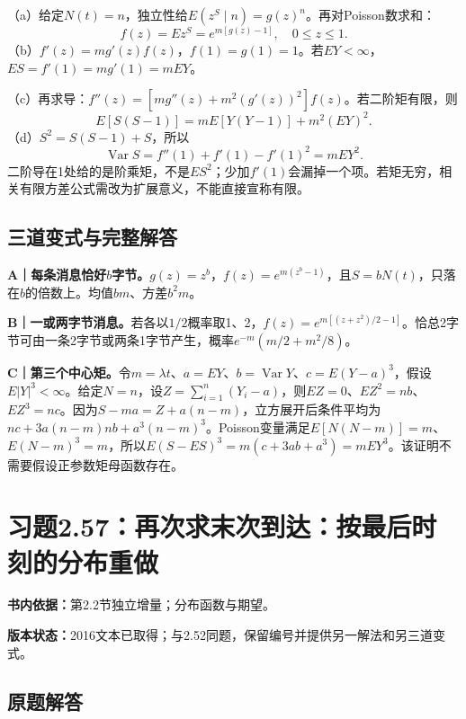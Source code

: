 \documentclass[
  11pt,
  a4paper,
  UTF8,fontset=fandol]{ctexart}
\let\OldSection\section
\renewcommand{\section}{\Needspace{7\baselineskip}\OldSection}
\let\OldSubsection\subsection
\renewcommand{\subsection}{\Needspace{5\baselineskip}\OldSubsection}
\begin{document}
（a）给定\(N(t)=n\)，独立性给\(E(z^S\mid n)=g(z)^n\)。再对Poisson数求和：
\[\boxed{f(z)=E z^S=e^{m[g(z)-1]}},\quad0\le z\le1.\]
（b）\(f'(z)=m g'(z)f(z)\)，\(f(1)=g(1)=1\)。若\(EY<\infty\)，\(\boxed{ES=f'(1)=m g'(1)=m EY}\)。

（c）再求导：\(f''(z)=[m g''(z)+m^2(g'(z))^2]f(z)\)。若二阶矩有限，则
\[\boxed{E[S(S-1)]=m E[Y(Y-1)]+m^2(EY)^2.}\] （d）\(S^2=S(S-1)+S\)，所以
\[\boxed{\operatorname{Var}S=f''(1)+f'(1)-f'(1)^2=m EY^2.}\]
二阶导在1处给的是阶乘矩，不是\(ES^2\)；少加\(f'(1)\)会漏掉一个项。若矩无穷，相关有限方差公式需改为扩展意义，不能直接宣称有限。

\subsection{三道变式与完整解答}\label{ux4e09ux9053ux53d8ux5f0fux4e0eux5b8cux6574ux89e3ux7b54-55}

\textbf{A｜每条消息恰好\(b\)字节。}\(g(z)=z^b\)，\(f(z)=e^{m(z^b-1)}\)，且\(S=bN(t)\)，只落在\(b\)的倍数上。均值\(bm\)、方差\(b^2m\)。

\textbf{B｜一或两字节消息。}若各以\(1/2\)概率取1、2，\(f(z)=e^{m[(z+z^2)/2-1]}\)。恰总2字节可由一条2字节或两条1字节产生，概率\(e^{-m}(m/2+m^2/8)\)。

\textbf{C｜第三个中心矩。}令\(m=\lambda t\)、\(a=EY\)、\(b=\operatorname{Var}Y\)、\(c=E(Y-a)^3\)，假设\(E|Y|^3<\infty\)。给定\(N=n\)，设\(Z=\sum_{i=1}^n(Y_i-a)\)，则\(EZ=0\)、\(EZ^2=nb\)、\(EZ^3=nc\)。因为\(S-ma=Z+a(n-m)\)，立方展开后条件平均为\(nc+3a(n-m)nb+a^3(n-m)^3\)。Poisson变量满足\(E[N(N-m)]=m\)、\(E(N-m)^3=m\)，所以\(E(S-ES)^3=m(c+3ab+a^3)=mEY^3\)。该证明不需要假设正参数矩母函数存在。

\newpage

\section{习题2.57：再次求末次到达：按最后时刻的分布重做}\label{ux4e60ux98982.57ux518dux6b21ux6c42ux672bux6b21ux5230ux8fbeux6309ux6700ux540eux65f6ux523bux7684ux5206ux5e03ux91cdux505a}

\textbf{书内依据：}第2.2节独立增量；分布函数与期望。

\textbf{版本状态：}2016文本已取得；与2.52同题，保留编号并提供另一解法和另三道变式。

\subsection{原题解答}\label{ux539fux9898ux89e3ux7b54-56}
\end{document}
